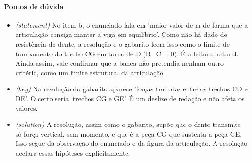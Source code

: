 \documentclass{article}%
\begin{document}
\paragraph{Pontos de dúvida}%
\begin{itemize}%
\item%
\textit{(statement)} No item b, o enunciado fala em 'maior valor de m de forma que a articulação consiga manter a viga em equilíbrio'. Como não há dado de resistência do dente, a resolução e o gabarito leem isso como o limite de tombamento do trecho CG em torno de D (R\_C = 0). É a leitura natural. Ainda assim, vale confirmar que a banca não pretendia nenhum outro critério, como um limite estrutural da articulação.%
\item%
\textit{(key)} Na resolução do gabarito aparece 'forças trocadas entre os trechos CD e DE'. O certo seria 'trechos CG e GE'. É um deslize de redação e não afeta os valores.%
\item%
\textit{(solution)} A resolução, assim como o gabarito, supõe que o dente transmite só força vertical, sem momento, e que é a peça CG que sustenta a peça GE. Isso segue da observação do enunciado e da figura da articulação. A resolução declara essas hipóteses explicitamente.%
\end{itemize}%
\end{document}
